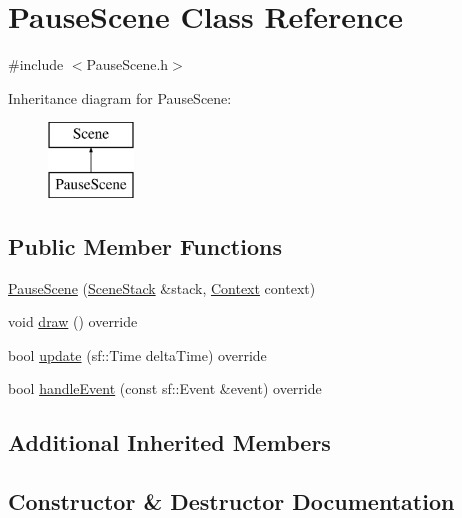 \hypertarget{class_pause_scene}{}\section{Pause\+Scene Class Reference}
\label{class_pause_scene}


{\ttfamily \#include $<$Pause\+Scene.\+h$>$}

Inheritance diagram for Pause\+Scene\+:\begin{figure}[H]
\begin{center}
\leavevmode
\includegraphics[height=2.000000cm]{class_pause_scene}
\end{center}
\end{figure}
\subsection*{Public Member Functions}
\begin{DoxyCompactItemize}
\item 
\hyperlink{class_pause_scene_a65ac2aa9fca0b1027481e60417749c4f}{Pause\+Scene} (\hyperlink{class_scene_stack}{Scene\+Stack} \&stack, \hyperlink{struct_scene_1_1_context}{Context} context)
\item 
void \hyperlink{class_pause_scene_abfd1398a064a83b3ae6ac5fd98aebf05}{draw} () override
\item 
bool \hyperlink{class_pause_scene_a8504260009b4dfb2380785e938e60b4b}{update} (sf\+::\+Time delta\+Time) override
\item 
bool \hyperlink{class_pause_scene_adeb06e37e0a2afa297ddbe795c3cbe94}{handle\+Event} (const sf\+::\+Event \&event) override
\end{DoxyCompactItemize}
\subsection*{Additional Inherited Members}


\subsection{Constructor \& Destructor Documentation}
\mbox{\label{class_pause_scene_a65ac2aa9fca0b1027481e60417749c4f}} 
